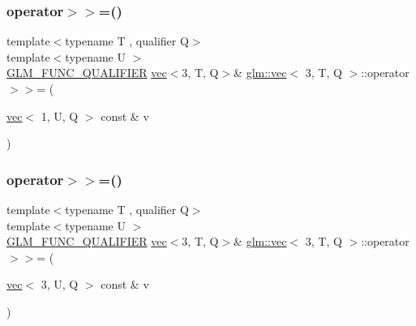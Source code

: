 \mbox{\label{structglm_1_1vec_3_013_00_01_t_00_01_q_01_4_afa71288540c821e11e3f316c16ed1274}} 
\subsubsection{\texorpdfstring{operator$>$$>$=()}{operator>>=()}\hspace{0.1cm}{\footnotesize\ttfamily [5/6]}}
{\footnotesize\ttfamily template$<$typename T , qualifier Q$>$ \\
template$<$typename U $>$ \\
\hyperlink{setup_8hpp_a33fdea6f91c5f834105f7415e2a64407}{G\+L\+M\+\_\+\+F\+U\+N\+C\+\_\+\+Q\+U\+A\+L\+I\+F\+I\+ER} \hyperlink{structglm_1_1vec}{vec}$<$3, T, Q$>$\& \hyperlink{structglm_1_1vec}{glm\+::vec}$<$ 3, T, Q $>$\+::operator$>$$>$= (\begin{DoxyParamCaption}\item[{\hyperlink{structglm_1_1vec}{vec}$<$ 1, U, Q $>$ const \&}]{v }\end{DoxyParamCaption})}

\mbox{\label{structglm_1_1vec_3_013_00_01_t_00_01_q_01_4_a62459f7f3447a3022b4079f62a719824}} 
\subsubsection{\texorpdfstring{operator$>$$>$=()}{operator>>=()}\hspace{0.1cm}{\footnotesize\ttfamily [6/6]}}
{\footnotesize\ttfamily template$<$typename T , qualifier Q$>$ \\
template$<$typename U $>$ \\
\hyperlink{setup_8hpp_a33fdea6f91c5f834105f7415e2a64407}{G\+L\+M\+\_\+\+F\+U\+N\+C\+\_\+\+Q\+U\+A\+L\+I\+F\+I\+ER} \hyperlink{structglm_1_1vec}{vec}$<$3, T, Q$>$\& \hyperlink{structglm_1_1vec}{glm\+::vec}$<$ 3, T, Q $>$\+::operator$>$$>$= (\begin{DoxyParamCaption}\item[{\hyperlink{structglm_1_1vec}{vec}$<$ 3, U, Q $>$ const \&}]{v }\end{DoxyParamCaption})}


